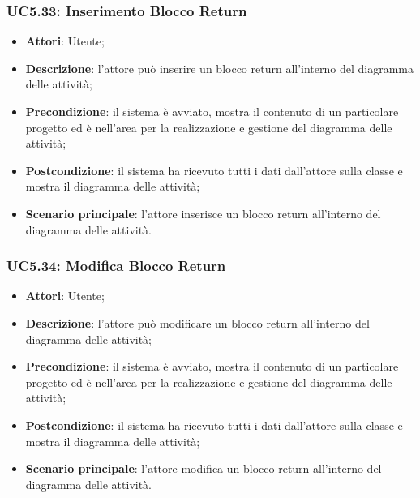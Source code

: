 \subsubsection{UC5.33: Inserimento Blocco Return}
\label{UC5.33}
\begin{itemize}
	\item \textbf{Attori}: Utente;
	\item \textbf{Descrizione}: l'attore può inserire un blocco return all'interno del diagramma delle attività;
	\item \textbf{Precondizione}: il sistema è avviato, mostra il contenuto di un particolare progetto ed è nell'area per la realizzazione e gestione del diagramma delle attività;
	\item \textbf{Postcondizione}: il sistema ha ricevuto tutti i dati dall'attore sulla classe e mostra il diagramma delle attività;
	\item \textbf{Scenario principale}: l'attore inserisce un blocco return all'interno del diagramma delle attività.
\end{itemize}

\subsubsection{UC5.34: Modifica Blocco Return}
\label{UC5.34}
\begin{itemize}
	\item \textbf{Attori}: Utente;
	\item \textbf{Descrizione}: l'attore può modificare un blocco return all'interno del diagramma delle attività;
	\item \textbf{Precondizione}: il sistema è avviato, mostra il contenuto di un particolare progetto ed è nell'area per la realizzazione e gestione del diagramma delle attività;
	\item \textbf{Postcondizione}: il sistema ha ricevuto tutti i dati dall'attore sulla classe e mostra il diagramma delle attività;
	\item \textbf{Scenario principale}: l'attore modifica un blocco return all'interno del diagramma delle attività.
\end{itemize}

